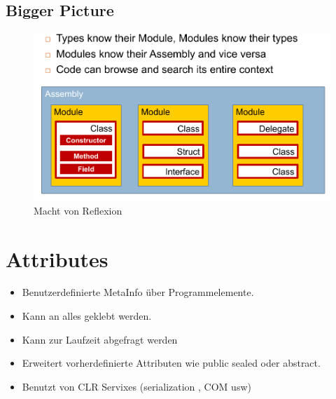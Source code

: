 \documentclass[a4paper,10pt]{scrartcl}
\begin{document}
\subsection{Bigger Picture}
\begin{figure}[h]
 \centering
 \includegraphics[scale=0.5]{./reflection3.png}
 \caption{Macht von Reflexion}
\end{figure}

\section{Attributes}
\begin{itemize}
 \item Benutzerdefinierte MetaInfo über Programmelemente.
 \item Kann an alles geklebt werden.
 \item Kann zur Laufzeit abgefragt werden
 \item Erweitert vorherdefinierte Attributen wie public sealed oder abstract.
 \item Benutzt von CLR Servixes (serialization , COM usw)
 
\end{itemize}
\end{document}

